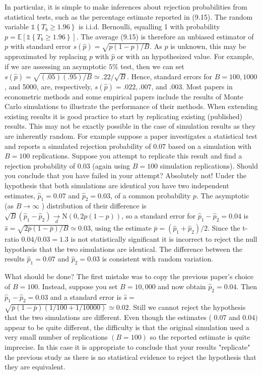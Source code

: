 \documentclass[10pt]{article}
\begin{document}
In particular, it is simple to make inferences about rejection probabilities from statistical tests, such as the percentage estimate reported in (9.15). The random variable $\mathbb{1}\left\{T_{b} \geq 1.96\right\}$ is i.i.d. Bernoulli, equalling 1 with probability $p=\mathbb{E}\left[\mathbb{1}\left\{T_{b} \geq 1.96\right\}\right]$. The average (9.15) is therefore an unbiased estimator of $p$ with standard error $s(\widehat{p})=\sqrt{p(1-p) / B}$. As $p$ is unknown, this may be approximated by replacing $p$ with $\widehat{p}$ or with an hypothesized value. For example, if we are assessing an asymptotic $5 \%$ test, then we can set $s(\widehat{p})=\sqrt{(.05)(.95) / B} \simeq .22 / \sqrt{B}$. Hence, standard errors for $B=100,1000$, and 5000, are, respectively, $s(\widehat{p})=.022, .007$, and $.003 .$ Most papers in econometric methods and some empirical papers include the results of Monte Carlo simulations to illustrate the performance of their methods. When extending existing results it is good practice to start by replicating existing (published) results. This may not be exactly possible in the case of simulation results as they are inherently random. For example suppose a paper investigates a statistical test and reports a simulated rejection probability of $0.07$ based on a simulation with $B=100$ replications. Suppose you attempt to replicate this result and find a rejection probability of $0.03$ (again using $B=100$ simulation replications). Should you conclude that you have failed in your attempt? Absolutely not! Under the hypothesis that both simulations are identical you have two independent estimates, $\widehat{p}_{1}=0.07$ and $\widehat{p}_{2}=0.03$, of a common probability $p$. The asymptotic (as $B \rightarrow \infty$ ) distribution of their difference is $\sqrt{B}\left(\widehat{p}_{1}-\widehat{p}_{2}\right) \underset{d}{\longrightarrow} \mathrm{N}(0,2 p(1-p))$, so a standard error for $\widehat{p}_{1}-\widehat{p}_{2}=0.04$ is $\widehat{s}=\sqrt{2 \bar{p}(1-\bar{p}) / B} \simeq 0.03$, using the estimate $\bar{p}=\left(\widehat{p}_{1}+\widehat{p}_{2}\right) / 2$. Since the t-ratio $0.04 / 0.03=1.3$ is not statistically significant it is incorrect to reject the null hypothesis that the two simulations are identical. The difference between the results $\widehat{p}_{1}=0.07$ and $\widehat{p}_{2}=0.03$ is consistent with random variation.

What should be done? The first mistake was to copy the previous paper's choice of $B=100$. Instead, suppose you set $B=10,000$ and now obtain $\widehat{p}_{2}=0.04$. Then $\widehat{p}_{1}-\widehat{p}_{2}=0.03$ and a standard error is $\widehat{s}=$ $\sqrt{\bar{p}(1-\bar{p})(1 / 100+1 / 10000)} \simeq 0.02$. Still we cannot reject the hypothesis that the two simulations are different. Even though the estimates ( $0.07$ and $0.04)$ appear to be quite different, the difficulty is that the original simulation used a very small number of replications $(B=100)$ so the reported estimate is quite imprecise. In this case it is appropriate to conclude that your results "replicate" the previous study as there is no statistical evidence to reject the hypothesis that they are equivalent.
\end{document}
